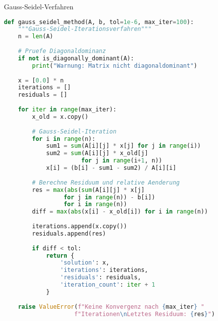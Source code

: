 \begin{examplecode}{Gauss-Seidel-Verfahren}
\begin{lstlisting}[language=Python, style=basesmol]
def gauss_seidel_method(A, b, tol=1e-6, max_iter=100):
    """Gauss-Seidel-Iterationsverfahren"""
    n = len(A)
    
    # Pruefe Diagonaldominanz
    if not is_diagonally_dominant(A):
        print("Warnung: Matrix nicht diagonaldominant")
    
    x = [0.0] * n
    iterations = []
    residuals = []
    
    for iter in range(max_iter):
        x_old = x.copy()
        
        # Gauss-Seidel-Iteration
        for i in range(n):
            sum1 = sum(A[i][j] * x[j] for j in range(i))
            sum2 = sum(A[i][j] * x_old[j] 
                      for j in range(i+1, n))
            x[i] = (b[i] - sum1 - sum2) / A[i][i]
            
        # Berechne Residuum und relative Aenderung
        res = max(abs(sum(A[i][j] * x[j] 
                 for j in range(n)) - b[i]) 
                 for i in range(n))
        diff = max(abs(x[i] - x_old[i]) for i in range(n))
        
        iterations.append(x.copy())
        residuals.append(res)
        
        if diff < tol:
            return {
                'solution': x,
                'iterations': iterations,
                'residuals': residuals,
                'iteration_count': iter + 1
            }
            
    raise ValueError(f"Keine Konvergenz nach {max_iter} "
                    f"Iterationen\nLetztes Residuum: {res}")
\end{lstlisting}
\end{examplecode}

